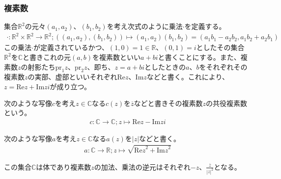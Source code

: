 \documentclass[dvipdfmx]{jsarticle}
\begin{document}
\subsubsection{複素数}%
\begin{dfn}
集合$\mathbb{R}^{2}$の元々$\left( a_{1},a_{2} \right)$、$\left( b_{1},b_{2} \right)$を考え次式のように乗法$\cdot$を定義する。
\begin{align*}
\cdot :\mathbb{R}^{2} \times \mathbb{R}^{2} \rightarrow \mathbb{R}^{2};\left( \left( a_{1},a_{2} \right),\left( b_{1},b_{2} \right) \right) \mapsto \left( a_{1},a_{2} \right)\left( b_{1},b_{2} \right) = \left( a_{1}b_{1} - a_{2}b_{2},a_{1}b_{2} + a_{2}b_{1} \right)
\end{align*}
この乗法$\cdot$が定義されているかつ、$(1,0) = 1 \in \mathbb{R}、(0,1) = i$としたその集合$\mathbb{R}^{2}$を$\mathbb{C}$と書きこれの元$(a,b)$を複素数といい$a + bi$と書くことにする。また、複素数$z$の射影たち$\mathrm{pr}_{1}z$、$\mathrm{pr}_{2}z$、即ち、$z = a + bi$としたときの$a$、$b$をそれぞれその複素数$z$の実部、虚部といいそれぞれ$\mathrm{Re}z$、$\mathrm{Im}z$などと書く。これにより、$z = \mathrm{Re}z + \mathrm{Im}zi$が成り立つ。
\end{dfn}
\begin{dfn}
次のような写像$c$を考え$z \in \mathbb{C}$なる$c(z)$を$\overline{z}$などと書きその複素数$z$の共役複素数という。
\begin{align*}
c:\mathbb{C} \rightarrow \mathbb{C};z \mapsto \mathrm{Re}z - \mathrm{Im}zi
\end{align*}
\end{dfn}
\begin{dfn}
次のような写像$a$を考え$z \in \mathbb{C}$なる$a(z)$を$|z|$などと書く。
\begin{align*}
a:\mathbb{C} \rightarrow \mathbb{R};z \mapsto \sqrt{{\mathrm{Re}z}^{2} + {\mathrm{Im}z}^{2}}
\end{align*}
\end{dfn}
\begin{thm}\label{4.1.2.9}
この集合$\mathbb{C}$は体であり複素数$z$の加法、乗法の逆元はそれぞれ$- z$、$\frac{\overline{z}}{|z|^{2}}$となる。
\end{thm}
\end{document}
